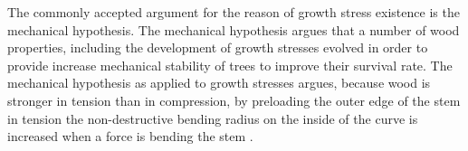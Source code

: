 The commonly accepted argument for the reason of growth stress existence is
the mechanical hypothesis. The mechanical hypothesis argues that a number of wood
properties, including the development of growth stresses evolved in order to
provide increase mechanical stability of trees to improve their
survival rate. The mechanical hypothesis as applied to growth stresses argues,
because wood is stronger in tension than in compression, by preloading the outer
edge of the stem in tension the non-destructive bending radius on
the inside of the curve is increased when a force is bending the stem \citep{barnett2003wood}.